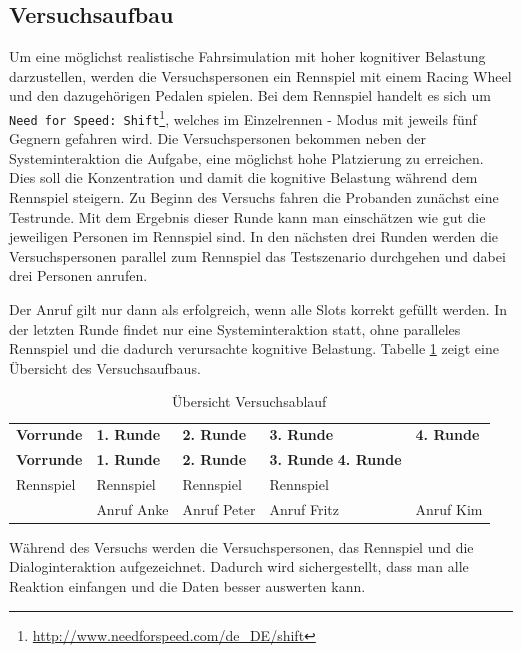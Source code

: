 \documentclass[12pt,a4paper]{scrartcl}
\begin{document}
\subsection{Versuchsaufbau}
Um eine möglichst realistische Fahrsimulation mit hoher kognitiver Belastung darzustellen, werden die Versuchspersonen ein Rennspiel mit einem Racing Wheel und den dazugehörigen Pedalen spielen. Bei dem Rennspiel handelt es sich um \texttt{Need for Speed: Shift}\footnote{\label{foot:nfs}\url{http://www.needforspeed.com/de_DE/shift}}, welches im Einzelrennen - Modus mit jeweils fünf Gegnern gefahren wird. Die Versuchspersonen bekommen neben der Systeminteraktion die Aufgabe, eine möglichst hohe Platzierung zu erreichen. Dies soll die Konzentration und damit die kognitive Belastung während dem Rennspiel steigern. Zu Beginn des Versuchs fahren die Probanden zunächst eine Testrunde. Mit dem Ergebnis dieser Runde kann man einschätzen wie gut die jeweiligen Personen im Rennspiel sind. In den nächsten drei Runden werden die Versuchspersonen parallel zum Rennspiel das Testszenario durchgehen und dabei drei Personen anrufen. 

 Der Anruf gilt nur dann als erfolgreich, wenn alle Slots korrekt gefüllt werden. 
In der letzten Runde findet nur eine Systeminteraktion statt, ohne paralleles Rennspiel und die dadurch verursachte kognitive Belastung. 
Tabelle \ref{ablauf1} zeigt eine Übersicht des Versuchsaufbaus.

\begin{longtable}{p{}p{}p{}p{}p{} }
	\label{ablauf1}\\
	\caption[Übersicht Versuchsablauf]{Übersicht Versuchsablauf}\\
	\hline
	\textbf{Vorrunde}&\textbf{1. Runde}&\textbf{2. Runde} &\textbf{3. Runde} & \textbf{4. Runde}\\
	\hline
	\endfirsthead
	\hline
	\textbf{Vorrunde}&\textbf{1. Runde}&\textbf{2. Runde} &\textbf{3. Runde} \textbf{4. Runde}\\
	\hline
	\endhead
Rennspiel & Rennspiel & Rennspiel & Rennspiel &\\
 & Anruf Anke & Anruf Peter & Anruf Fritz & Anruf Kim \\
\hline
\end{longtable}
Während des Versuchs werden die Versuchspersonen, das Rennspiel und die Dialoginteraktion aufgezeichnet. Dadurch wird sichergestellt, dass man alle Reaktion einfangen und die Daten besser auswerten kann. 
\end{document}
